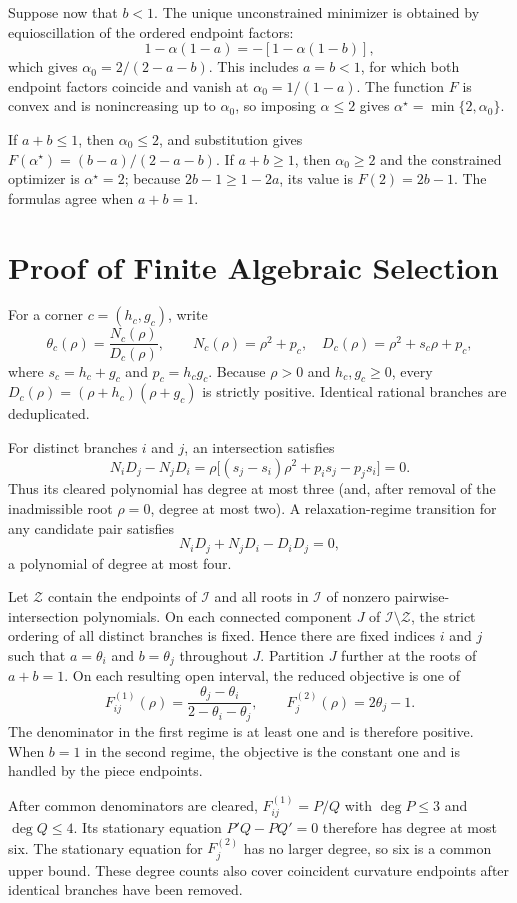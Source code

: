 \documentclass[11pt]{article}
\theoremstyle{definition}
\begin{document}
Suppose now that $b<1$. The unique unconstrained minimizer is obtained by
equioscillation of the ordered endpoint factors:
\[
1-\alpha(1-a)=-[1-\alpha(1-b)],
\]
which gives $\alpha_0=2/(2-a-b)$. This includes $a=b<1$, for which both
endpoint factors coincide and vanish at $\alpha_0=1/(1-a)$.
The function $F$ is convex and is nonincreasing up to $\alpha_0$, so imposing
$\alpha\le2$ gives $\alpha^\star=\min\{2,\alpha_0\}$.

If $a+b\le1$, then $\alpha_0\le2$, and substitution gives
$F(\alpha^\star)=(b-a)/(2-a-b)$. If $a+b\ge1$, then
$\alpha_0\ge2$ and the constrained optimizer is $\alpha^\star=2$; because
$2b-1\ge1-2a$, its value is $F(2)=2b-1$. The formulas agree when
$a+b=1$.

\section{Proof of Finite Algebraic Selection}\label{app:finite}
For a corner $c=(h_c,g_c)$, write
\[
\theta_c(\rho)=\frac{N_c(\rho)}{D_c(\rho)},\qquad
N_c(\rho)=\rho^2+p_c,\quad
D_c(\rho)=\rho^2+s_c\rho+p_c,
\]
where $s_c=h_c+g_c$ and $p_c=h_cg_c$. Because $\rho>0$ and
$h_c,g_c\ge0$, every $D_c(\rho)=(\rho+h_c)(\rho+g_c)$ is strictly positive.
Identical rational branches are deduplicated.

For distinct branches $i$ and $j$, an intersection satisfies
\[
N_iD_j-N_jD_i
=\rho\big[(s_j-s_i)\rho^2+p_i s_j-p_j s_i\big]=0.
\]
Thus its cleared polynomial has degree at most three (and, after removal of
the inadmissible root $\rho=0$, degree at most two). A relaxation-regime
transition for any candidate pair satisfies
\[
N_iD_j+N_jD_i-D_iD_j=0,
\]
a polynomial of degree at most four.

Let $\mathcal Z$ contain the endpoints of $\mathcal I$ and all roots in
$\mathcal I$ of nonzero pairwise-intersection polynomials. On each connected
component $J$ of $\mathcal I\setminus\mathcal Z$, the strict ordering of all
distinct branches is fixed. Hence there are fixed indices $i$ and $j$ such
that $a=\theta_i$ and $b=\theta_j$ throughout $J$. Partition $J$ further at
the roots of $a+b=1$. On each resulting open interval, the reduced objective
is one of
\[
F_{ij}^{(1)}(\rho)
=\frac{\theta_j-\theta_i}{2-\theta_i-\theta_j},
\qquad
F_j^{(2)}(\rho)=2\theta_j-1.
\]
The denominator in the first regime is at least one and is therefore positive.
When $b=1$ in the second regime, the objective is the constant one and is
handled by the piece endpoints.

After common denominators are cleared, $F_{ij}^{(1)}=P/Q$ with
$\deg P\le3$ and $\deg Q\le4$. Its stationary equation
$P'Q-PQ'=0$ therefore has degree at most six. The stationary equation for
$F_j^{(2)}$ has no larger degree, so six is a common upper bound. These degree
counts also cover coincident curvature endpoints after identical branches
have been removed.
\end{document}
